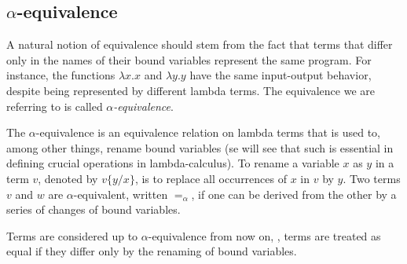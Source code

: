 \begin{comment}
\begin{equation*}
\begin{split}
FV(x) &= \{x\}, &  FV(*) &= \emptyset,  \\
FV(f(v_1, \ldots, v_n)), &= FV(v_1) \cup \ldots \cup FV(v_n)& FV(\lambda x: \mathbb{A}. v) &= FV(v) \backslash \{x\}, \\
FV(v w) &= FV(v) \cup FV(w), & FV(v \otimes w) &= FV(v) \cup FV(w), \\
FV(\text{pm} \hspace{3 pt} v \hspace{3 pt} \text{to} \hspace{3 pt} x \otimes y. w), &= FV(v) \cup (FV(w)  \backslash \{x,y\}) & FV(\text{dis}(v)) &= FV(v),\\
FV(v \text{ to } *.w) &= FV(v) \cup FV(w)  &  FV(\text{inl}_\typeB) &=  FV(v). \\
\end{split}
\end{equation*}
\end{comment}


\subsection{$\alpha$-equivalence}


 
A natural notion of equivalence should stem from the fact that terms that differ only in the names of their bound variables represent the same program. For instance, the functions $\lambda x.x $ and $\lambda y.y$ have the same input-output behavior, despite being represented by different lambda terms. The equivalence we are referring to is called $\alpha$\emph{-equivalence}.

\begin{definition} 
  The $\alpha$-equivalence is an equivalence relation on lambda terms that is used to, among other things, rename bound variables (se will see that such is essential in defining crucial operations in lambda-calculus). To rename a variable $x$ as $y$ in a term $v$, denoted by $v\{y/x\}$, is to replace all occurrences of $x$ in $v$ by $y$. Two terms $v$ and $w$ are $\alpha$-equivalent, written $=_{\alpha}$, if one can be derived from the other by a series of changes of bound variables.
\end{definition}

\begin{convention}
  Terms are considered up to $\alpha$-equivalence from now on, \ie,  terms are treated as equal if they differ only by the renaming of bound variables.
\end{convention}

